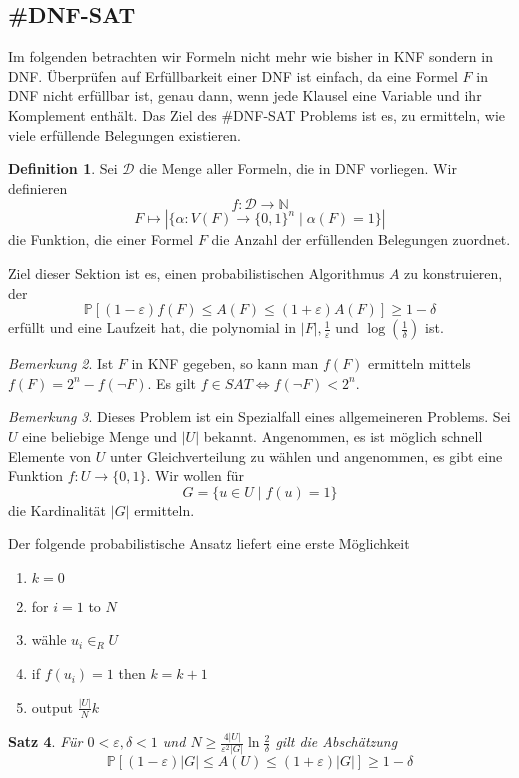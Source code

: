 \documentclass[a4paper, 12pt]{article}
\theoremstyle{plain}
\newtheorem{theorem}{Satz}[section] %
\theoremstyle{definition}
\newtheorem{definition}[theorem]{Definition} %
\theoremstyle{lemma}
\theoremstyle{remark}
\newtheorem{remark}[theorem]{Bemerkung}
\theoremstyle{corollary}
\theoremstyle{example}
\begin{document}
	\subsection{\#DNF-SAT}
	Im folgenden betrachten wir Formeln nicht mehr wie bisher in KNF sondern in DNF. Überprüfen auf Erfüllbarkeit einer DNF ist einfach, da eine Formel $F$ in DNF nicht erfüllbar ist, genau dann, wenn jede Klausel eine Variable und ihr Komplement enthält. Das Ziel des \#DNF-SAT Problems ist es, zu ermitteln, wie viele erfüllende Belegungen existieren. 
	\begin{definition}
		Sei $\mathcal{D}$ die Menge aller Formeln, die in DNF vorliegen. Wir definieren \[f: \mathcal{D} \to \mathbb{N}\] \[F \mapsto \left|\{\alpha: V(F) \to \{0,1\}^n \mid \alpha(F) = 1\}\right|\] die Funktion, die einer Formel $F$ die Anzahl der erfüllenden Belegungen zuordnet. 
	\end{definition}
	Ziel dieser Sektion ist es, einen probabilistischen Algorithmus $A$ zu konstruieren, der \[\mathbb{P}[(1-\varepsilon)f(F) \leq A(F) \leq (1+\varepsilon)A(F)] \geq 1-\delta\] erfüllt und eine Laufzeit hat, die polynomial in $\left|F\right|, \frac{1}{\varepsilon}$ und $\log(\frac{1}{\delta})$ ist.
	\begin{remark}
		Ist $F$ in KNF gegeben, so kann man $f(F)$ ermitteln mittels $f(F) = 2^n - f(\lnot F)$. Es gilt $f \in SAT \Leftrightarrow f(\lnot F) < 2^n$.
	\end{remark}
	\begin{remark}
		Dieses Problem ist ein Spezialfall eines allgemeineren Problems. Sei $U$ eine beliebige Menge und $\left|U\right|$ bekannt. Angenommen, es ist möglich schnell Elemente von $U$ unter Gleichverteilung zu wählen und angenommen, es gibt eine Funktion $f:U \to \{0,1\}$. Wir wollen für \[G = \{u \in U \mid f(u) = 1\}\] die Kardinalität $\left|G\right|$ ermitteln.
	\end{remark}
	Der folgende probabilistische Ansatz liefert eine erste Möglichkeit
	\begin{enumerate}
		\item $k=0$
		\item for $i=1$ to $N$
		\item wähle $u_i \in_R U$
		\item if $f(u_i) = 1$ then $k=k+1$
		\item output $\frac{\left|U\right|}{N}k$
	\end{enumerate}
	\begin{theorem}\label{thm: dnf sat ineq}
		Für $0<\varepsilon, \delta < 1$ und $N \geq \frac{4\left|U\right|}{\varepsilon^2 \left|G\right|} \ln \frac{2}{\delta}$ gilt die Abschätzung \[\mathbb{P}[(1-\varepsilon)\left|G\right| \leq A(U) \leq (1+\varepsilon) \left|G\right|] \geq 1-\delta\]
	\end{theorem}
\end{document}
